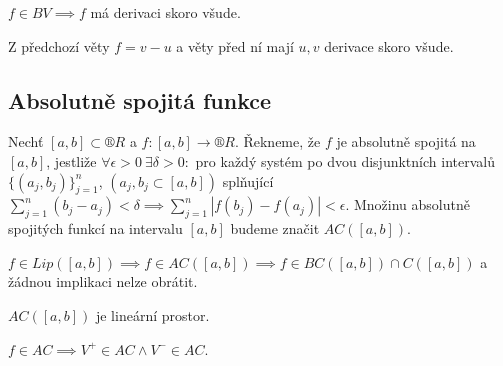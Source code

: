\documentclass[12pt]{article}					%
\begin{document}
	\begin{dusledek}
		$f \in BV \implies f$ má derivaci skoro všude.

		\begin{dukazin}
			Z předchozí věty $f = v - u$ a věty před ní mají $u, v$ derivace skoro všude.
		\end{dukazin}
	\end{dusledek}


	\subsection{Absolutně spojitá funkce}
	\begin{definice}
		Nechť $[a, b] \subset ®R$ a $f: [a, b] \rightarrow ®R$. Řekneme, že $f$ je absolutně spojitá na $[a, b]$, jestliže $\forall \epsilon > 0\ \exists \delta > 0:$ pro každý systém po dvou disjunktních intervalů $\{(a_j, b_j)\}_{j=1}^n$, $(a_j, b_j \subset [a, b])$ splňující $\sum_{j=1}^n (b_j - a_j) < \delta \implies \sum_{j=1}^n |f(b_j) - f(a_j)| < \epsilon$. Množinu absolutně spojitých funkcí na intervalu $[a, b]$ budeme značit $AC([a, b])$.
	\end{definice}

	\begin{poznamka}
		$f \in Lip([a, b]) \implies f \in AC([a, b]) \implies f \in BC([a, b]) \cap C([a, b])$ a žádnou implikaci nelze obrátit.

		$AC([a, b])$ je lineární prostor.

		$f \in AC \implies V^+ \in AC \land V^- \in AC$.
	\end{poznamka}
\end{document}
